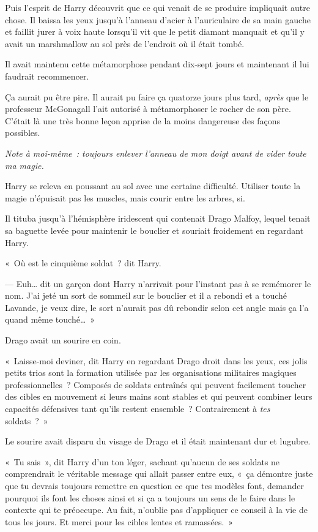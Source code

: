 {Puis l'esprit de Harry découvrit que ce qui venait de se produire impliquait autre chose.
Il baissa les yeux jusqu'à l'anneau d'acier à l'auriculaire de sa main gauche et faillit jurer à voix haute lorsqu'il vit que le petit diamant manquait et qu'il y avait un marshmallow au sol près de l'endroit où il était tombé.

Il avait maintenu cette métamorphose pendant dix-sept jours et maintenant il lui faudrait recommencer.

Ça aurait pu être pire.
Il aurait pu faire ça quatorze jours plus tard, \emph{après} que le professeur McGonagall l'ait autorisé à métamorphoser le rocher de son père.
C'était là une très bonne leçon apprise de la moins dangereuse des façons possibles.

\emph{Note à moi-même~: toujours enlever l'anneau de mon doigt avant de vider toute ma magie.}

Harry se releva en poussant au sol avec une certaine difficulté.
Utiliser toute la magie n'épuisait pas les muscles, mais courir entre les arbres, si.

Il tituba jusqu'à l'hémisphère iridescent qui contenait Drago Malfoy, lequel tenait sa baguette levée pour maintenir le bouclier et souriait froidement en regardant Harry.

«~Où est le cinquième soldat~? dit Harry.

--- Euh… dit un garçon dont Harry n'arrivait pour l'instant pas à se remémorer le nom.
J'ai jeté un sort de sommeil sur le bouclier et il a rebondi et a touché Lavande, je veux dire, le sort n'aurait pas dû rebondir selon cet angle mais ça l'a quand même touché…~»

Drago avait un sourire en coin.

«~Laisse-moi deviner, dit Harry en regardant Drago droit dans les yeux, ces jolis petits trios sont la formation utilisée par les organisations militaires magiques professionnelles~?
Composés de soldats entraînés qui peuvent facilement toucher des cibles en mouvement si leurs mains sont stables et qui peuvent combiner leurs capacités défensives tant qu'ils restent ensemble~?
Contrairement à \emph{tes} soldats~?~»

Le sourire avait disparu du visage de Drago et il était maintenant dur et lugubre.

«~Tu sais~», dit Harry d'un ton léger, sachant qu'aucun de ses soldats ne comprendrait le véritable message qui allait passer entre eux, «~ça démontre juste que tu devrais toujours remettre en question ce que tes modèles font, demander pourquoi ils font les choses ainsi et si ça a toujours un sens de le faire dans le contexte qui te préoccupe.
Au fait, n'oublie pas d'appliquer ce conseil à la vie de tous les jours.
Et merci pour les cibles lentes et ramassées.~»

}
